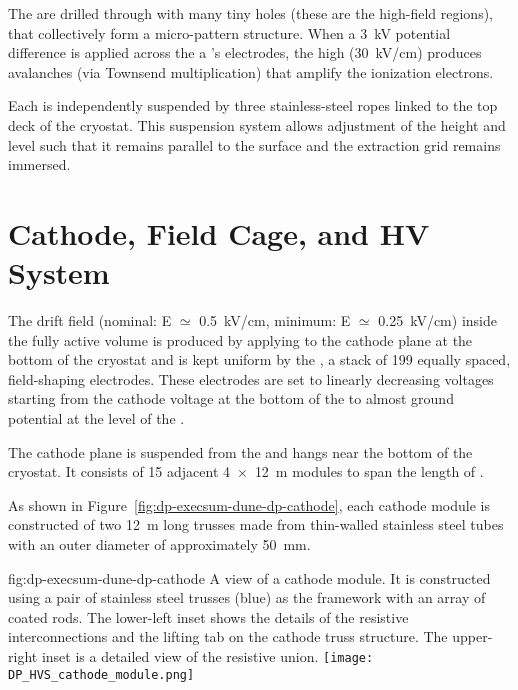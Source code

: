 The  are drilled through with many tiny holes (these are the high-field regions), that collectively form a micro-pattern structure. When a \SI{3}{kV} potential difference is applied across the a 's electrodes, the high \efield (\SI{30}{kV/cm}) produces avalanches (via Townsend multiplication) that amplify the ionization electrons.  


Each  is independently suspended by three stainless-steel ropes linked to the top deck of the cryostat. This suspension system allows adjustment of the  height and level such that it remains parallel to the  surface and the extraction grid remains immersed.   

\section{Cathode, Field Cage, and HV System}
\label{sec:dp-execsum-cathode}

The drift field (nominal: E ${\simeq}$ \SI{0.5}{kV/cm}, minimum: E ${\simeq}$ \SI{0.25}{kV/cm}) inside the fully active  volume is produced by applying  to the cathode plane at the bottom of the cryostat and is kept uniform by the , a stack of \num{199} equally spaced, field-shaping electrodes. 
These electrodes are set to linearly decreasing voltages starting from the cathode voltage at the bottom of the  to almost ground potential at the level of the . 


The cathode plane  is suspended from the  and hangs near the  bottom of the cryostat. It consists of 15 adjacent \SI{4x12}{m} 
modules to span the \dptpclen length of . 

As shown in  Figure~\ref{fig:dp-execsum-dune-dp-cathode}, each cathode module is constructed of two \SI{12}{m} long trusses made from thin-walled stainless steel tubes with an  outer diameter of approximately \SI{50}{mm}. 


\begin{dunefigure}{fig:dp-execsum-dune-dp-cathode}
{A view of a  cathode module.  It is constructed using a pair of stainless steel trusses (blue) as the framework with an array of coated  rods. 
The lower-left inset shows the details of the resistive interconnections and the lifting tab on the cathode truss structure. The upper-right inset is a detailed view of the resistive union.}
\texttt{[image: DP\_HVS\_cathode\_module.png]}
\end{dunefigure}

